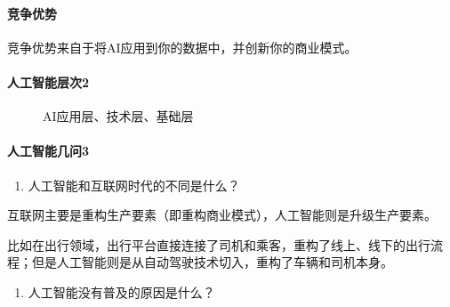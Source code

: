 \documentclass[letterpaper,11pt,english]{sphinxmanual}
\begin{document}
\paragraph{竞争优势}
\label{\detokenize{chapter_introduction/AI:id23}}
竞争优势来自于将AI应用到你的数据中，并创新你的商业模式。
%
\begin{footnote}[191]\sphinxAtStartFootnote
{}
%
\end{footnote}


\paragraph{人工智能层次2\sphinxfootnotemark[192]}
\label{\detokenize{chapter_introduction/AI:id24}}%
\begin{footnotetext}[192]\sphinxAtStartFootnote
{}
%
\end{footnotetext}\ignorespaces 
\begin{figure}[H]
\centering
\capstart

\noindent{}
\caption{AI应用层、技术层、基础层}\label{\detokenize{chapter_introduction/AI:id38}}\end{figure}


\paragraph{人工智能几问3\sphinxfootnotemark[193]}
\label{\detokenize{chapter_introduction/AI:id25}}%
\begin{footnotetext}[193]\sphinxAtStartFootnote
{}
%
\end{footnotetext}\ignorespaces \begin{enumerate}
%
\item {} 
人工智能和互联网时代的不同是什么？

\end{enumerate}

互联网主要是重构生产要素（即重构商业模式），人工智能则是升级生产要素。

比如在出行领域，出行平台直接连接了司机和乘客，重构了线上、线下的出行流程；但是人工智能则是从自动驾驶技术切入，重构了车辆和司机本身。
\begin{enumerate}
%
\setcounter{enumi}{1}
\item {} 
人工智能没有普及的原因是什么？

\end{enumerate}
\end{document}
